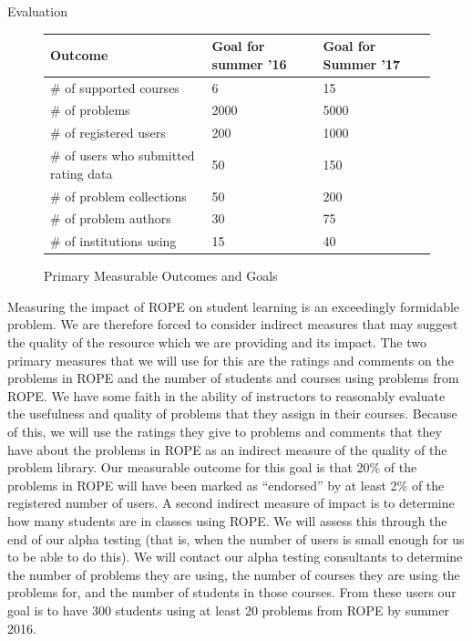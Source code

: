 \documentclass[11pt]{article}
\begin{document}
\begin{section}{Evaluation}
\begin{figure}
\begin{center}
\begin{tabular}{|l|l|l|}
  \hline
  \textbf{Outcome} & \textbf{Goal for summer '16} & \textbf{Goal for
  Summer '17} \\
  \hline
  \hline
  \# of supported courses & 6 & 15 \\
  \hline
  \# of problems & 2000 & 5000 \\
  \hline
  \# of registered users & 200 & 1000 \\
  \hline
  \# of users who submitted rating data & 50 & 150 \\
  \hline
  \# of problem collections & 50 & 200 \\
  \hline
  \# of problem authors & 30 & 75 \\
  \hline
  \# of institutions using & 15 & 40 \\
  \hline
\end{tabular}
\caption{Primary Measurable Outcomes and Goals}
\label{outcomes}
\end{center}
\end{figure}

Measuring the impact of ROPE on student learning is an exceedingly
formidable problem.  We are therefore forced to consider indirect measures
that may suggest the quality of the resource which we are providing and
its impact.  The two primary measures that we will use for this are the
ratings and comments on the problems in ROPE and the number of students
and courses using problems from ROPE.  We have some faith in the
ability of instructors to reasonably evaluate the usefulness and quality
of problems that they assign in their courses.  Because of this, we will
use the ratings they give to problems and comments that they have about
the problems in ROPE as an indirect measure of the quality of the
problem library.  Our measurable outcome for this goal is that 20\% of the
problems in ROPE will have been marked as ``endorsed'' by at least 2\% of
the registered number of users.  A second indirect measure of impact is to
determine how many students are in classes using ROPE.  We will assess
this through the end of our alpha testing (that is, when the number of
users is small enough for us to be able to do this).  We will contact our
alpha testing consultants to determine the number of problems they are
using, the number of courses they are using the problems for, and the
number of students in those courses.  From these users our goal is to have
300 students using at least 20 problems from ROPE by summer 2016. 

\end{section}
\end{document}
